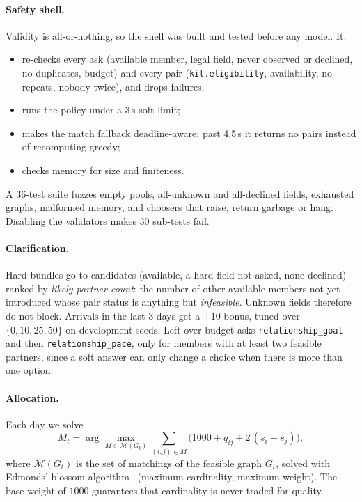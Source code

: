 \documentclass[10pt]{article}
\begin{document}
\paragraph{Safety shell.} Validity is all-or-nothing, so the shell was built and tested before any model. It:
\begin{itemize}
\item re-checks every ask (available member, legal field, never observed or declined, no duplicates, budget) and every pair (\texttt{kit.eligibility}, availability, no repeats, nobody twice), and drops failures;
\item runs the policy under a 3\,s soft limit;
\item makes the match fallback deadline-aware: past 4.5\,s it returns no pairs instead of recomputing greedy;
\item checks memory for size and finiteness.
\end{itemize}
A 36-test suite fuzzes empty pools, all-unknown and all-declined fields, exhausted graphs, malformed memory, and choosers that raise, return garbage or hang. Disabling the validators makes 30 sub-tests fail.

\paragraph{Clarification.} Hard bundles go to candidates (available, a hard field not asked, none declined) ranked by \emph{likely partner count}: the number of other available members not yet introduced whose pair status is anything but \emph{infeasible}. Unknown fields therefore do not block. Arrivals in the last 3 days get a $+10$ bonus, tuned over $\{0,10,25,50\}$ on development seeds. Left-over budget asks \texttt{relationship\_goal} and then \texttt{relationship\_pace}, only for members with at least two feasible partners, since a soft answer can only change a choice when there is more than one option.

\paragraph{Allocation.} Each day we solve
\begin{equation}
M_t=\arg\max_{M\in\mathcal{M}(G_t)} \sum_{(i,j)\in M} \big(1000 + \hat q_{ij} + 2\,(s_i+s_j)\big),
\end{equation}
where $\mathcal{M}(G_t)$ is the set of matchings of the feasible graph $G_t$, solved with Edmonds' blossom algorithm~\cite{edmonds1965paths} (maximum-cardinality, maximum-weight). The base weight of $1000$ guarantees that cardinality is never traded for quality.
\end{document}
